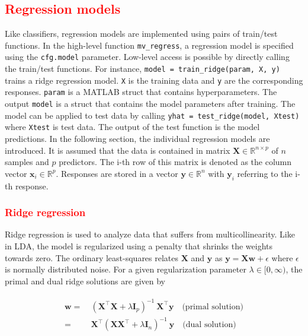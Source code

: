 \documentclass[utf8]{frontiersSCNS} %
\newcommand{\w}{\mathbf{w}}
\newcommand{\x}{\mathbf{x}}
\newcommand{\y}{\mathbf{y}}
\newcommand{\I}{\mathbf{I}}
\newcommand{\R}{\mathbb{R}}
\newcommand{\X}{\mathbf{X}}
\newcommand{\ttt}[1]{\texttt{#1}}
\newcommand{\red}[1]{\textcolor{red}{#1}}
\begin{document}
\red{\subsection{Regression models}\label{sec:regression}}

Like classifiers, regression models are implemented using pairs of train/test functions. In the high-level function \ttt{mv\_regress}, a regression model is specified using the \ttt{cfg.model} parameter. Low-level access is possible by directly calling the train/test functions. For instance, \ttt{model = train\_ridge(param, X, y)} trains a ridge regression model. \ttt{X} is the training data and \ttt{y} are the corresponding responses. \ttt{param} is a MATLAB struct that contains hyperparameters. The output \ttt{model} is a struct that contains the model parameters after training. The model can be applied to test data by calling \ttt{yhat = test\_ridge(model, Xtest)} where \ttt{Xtest} is test data. The output of the test function is the model predictions. In the following section, the individual regression models are introduced. It is assumed that the data is contained in matrix $\X\in\R^{n \times p}$ of $n$ samples and $p$ predictors. The i-th row of this matrix is denoted as the column vector $\x_i\in\R^p$. Responses are stored in a vector $\y\in\R^n$ with $\y_i$ referring to the i-th response.

\red{\subsubsection{Ridge regression}}

Ridge regression is used to analyze data that suffers from multicollinearity. Like in LDA, the model is regularized using a penalty that shrinks the weights towards zero. The ordinary least-squares relates $\X$ and $\y$ as $\y = \X\w + \epsilon$ where $\epsilon$ is normally distributed noise. For a given regularization parameter $\lambda\in[0,\infty)$, the primal and dual ridge solutions are given by


\begin{align}
\begin{split}
\label{eq:ridge}
\w =\ & (\X^\top\X + \lambda\I_p)^{-1}\ \X^\top\y \quad\text{(primal solution)}\\
 =\ & \X^\top (\X\X^\top + \lambda\I_n)^{-1}\ \y \quad\text{(dual solution)}
\end{split}
\end{align}
\end{document}
